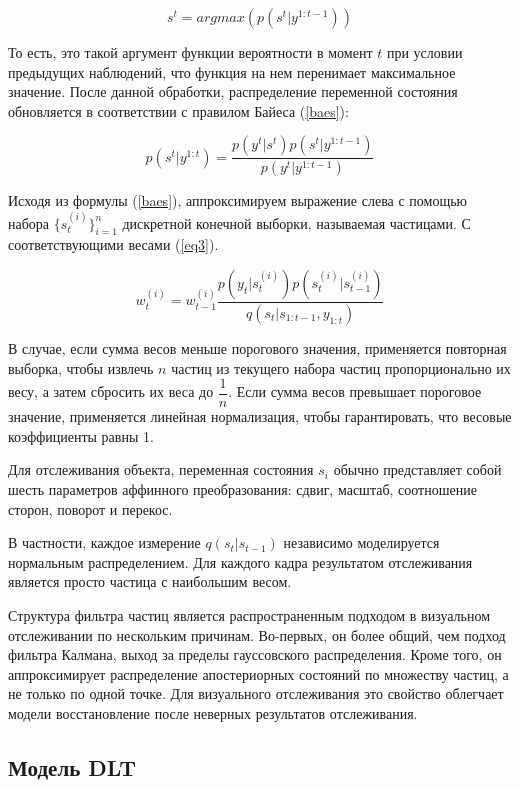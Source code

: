 \documentclass[14pt, a4paper]{article}
\begin{document}
\begin{equation}\label{eq1}
    s^{t} = argmax(p(s^t|y^{1:t-1}))
\end{equation}

То есть, это такой аргумент функции вероятности в момент $t$ при условии предыдущих наблюдений, что функция на нем перенимает максимальное значение. После данной обработки, распределение переменной состояния обновляется в соответствии с правилом Байеса (\ref{baes}):

\begin{equation}\label{baes}
    p(s^t|y^{1:t}) = \dfrac{p(y^t|s^t)p(s^t|y^{1:t-1})}{p(y^t|y^{1:t-1})} 
\end{equation}

Исходя из формулы (\ref{baes}), аппроксимируем выражение слева с помощью набора $\{s^{(i)}_t\}^{n}_{i=1}$ дискретной конечной выборки, называемая частицами. С соответствующими весами (\ref{eq3}).

\begin{equation} \label{eq3}
    w^{(i)}_{t}=w^{(i)}_{t-1}\dfrac{p(y_t|s^{(i)}_t)p(s^{(i)}_t|s^{(i)}_{t-1})}{q(s_t|s_{1:t-1},y_{1:t})}
\end{equation}

В случае, если сумма весов меньше порогового значения, применяется повторная выборка, чтобы извлечь $n$ частиц из текущего набора частиц пропорционально их весу, а затем сбросить их веса до $\dfrac{1}{n}$. Если сумма весов превышает пороговое значение, применяется линейная нормализация, чтобы гарантировать, что весовые коэффициенты равны 1. 

Для отслеживания объекта, переменная состояния $s_i$ обычно представляет собой шесть параметров аффинного преобразования: сдвиг, масштаб, соотношение сторон, поворот и перекос.

В частности, каждое измерение $q(s_t|s_{t-1})$ независимо моделируется нормальным распределением. Для каждого кадра результатом отслеживания является просто частица с наибольшим весом.

Структура фильтра частиц является распространенным подходом в визуальном отслеживании по нескольким причинам. Во-первых, он более общий, чем подход фильтра Калмана, выход за пределы гауссовского распределения. Кроме того, он аппроксимирует распределение апостериорных состояний по множеству частиц, а не только по одной точке. Для визуального отслеживания это свойство облегчает модели восстановление после неверных результатов отслеживания.

\subsection{Модель DLT} \label{DLT}
\end{document}
